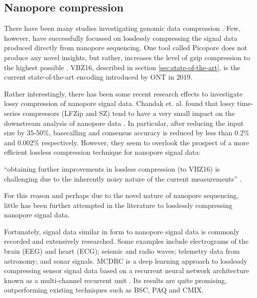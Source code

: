 \subsection{Nanopore compression}

There have been many studies investigating genomic data compression \cite{genomic-comp}. Few, however, have successfully focussed on losslessly compressing the signal data produced directly from nanopore sequencing. One tool called Picopore does not produce any novel insights, but rather, increases the level of gzip compression to the highest possible \cite{picopore}. VBZ16, described in section \ref{sec:state-of-the-art}, is the current state-of-the-art encoding introduced by ONT in 2019.

Rather interestingly, there has been some recent research effects to investigate lossy compression of nanopore signal data. Chandak et. al. found that lossy time-series compressors (LFZip and SZ) tend to have a very small impact on the downstream analysis of nanopore data \cite{lossy-nano, lfzip}. In particular, after reducing the input size by 35-50\%, basecalling and consensus accuracy is reduced by less than 0.2\% and 0.002\% respectively. However, they seem to overlook the prospect of a more efficient lossless compression technique for nanopore signal data:
\begin{displayquote}
``obtaining further improvements in lossless compression (to VBZ16) is challenging due to the inherently noisy nature of the current measurements'' \cite{lossy-nano}.
\end{displayquote}
For this reason and perhaps due to the novel nature of nanopore sequencing, little has been further attempted in the literature to losslessly compressing nanopore signal data.

Fortunately, signal data similar in form to nanopore signal data is commonly recorded and extensively researched. Some examples include electrograms of the brain (EEG) and heart (ECG); seismic and radio waves; telemetry data from astronomy; and sonar signals. MCDRC is a deep learning approach to losslessly compressing sensor signal data based on a recurrent neural network architecture known as a multi-channel recurrent unit \cite{mcdrc}. Its results are quite promising, outperforming existing techniques such as BSC, PAQ and CMIX.
